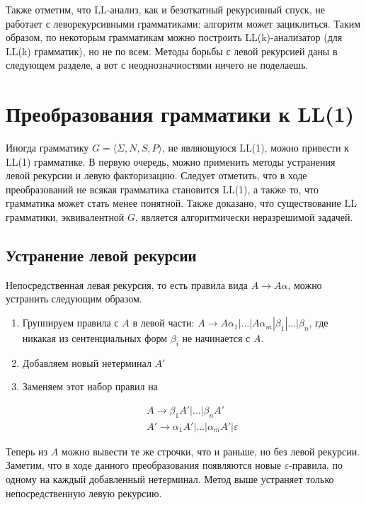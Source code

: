 \documentclass[10pt]{article}         %
\begin{document}
	Также отметим, что LL-анализ, как и безоткатный рекурсивный спуск, не работает с леворекурсивными грамматиками: алгоритм может зациклиться. Таким образом, по некоторым грамматикам можно построить LL(k)-анализатор (для LL(k) грамматик), но не по всем. Методы борьбы с левой рекурсией даны в следующем разделе, а вот с неоднозначностями ничего не поделаешь.
	
	\section{Преобразования грамматики к LL(1)}
	
	Иногда грамматику $G = \langle \Sigma, N, S, P \rangle$, не являющуюся LL(1), можно привести к LL(1) грамматике. В первую очередь, можно применить методы устранения левой рекурсии и левую факторизацию. Следует отметить, что в ходе преобразований не всякая грамматика становится LL(1), а также то, что грамматика может стать менее понятной. Также доказано, что существование LL грамматики, эквивалентной $G$, является алгоритмически неразрешимой задачей. 
	
	\subsection{Устранение левой рекурсии}
	Непосредственная левая рекурсия, то есть правила вида $A \to A\alpha$, можно устранить следующим образом.
	
	\begin{enumerate}
		\item Группируем правила с $A$ в левой части:
		$A \to A\alpha_1|\dots|A\alpha_m|\beta_1|\dots|\beta_n$, где никакая из сентенциальных форм $\beta_i$ не начинается с $A$.
		\item Добавляем новый нетерминал $A'$
		\item Заменяем этот набор правил на
		
		\begin{align*} 
			A \to \beta_1 A'|\dots|\beta_n A' \\
			A' \to \alpha_1 A'|\dots|\alpha_m A'|\varepsilon
		\end{align*}
	\end{enumerate} 
	
	Теперь из $A$ можно вывести те же строчки, что и раньше, но без левой рекурсии. Заметим, что в ходе данного преобразования появляются новые $\varepsilon$-правила, по одному на каждый добавленный нетерминал.
	Метод выше устраняет только непосредственную левую рекурсию.
	
\end{document}
